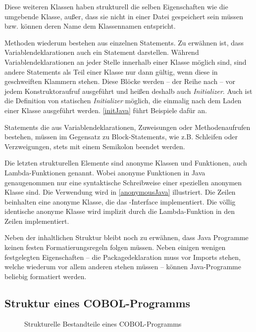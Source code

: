 Diese weiteren Klassen haben strukturell die selben Eigenschaften wie die umgebende Klasse, außer, dass sie nicht in einer Datei gespeichert sein müssen bzw. können deren Name dem Klassennamen entspricht.

Methoden wiederum bestehen aus einzelnen Statements. Zu erwähnen ist, dass Variablendeklarationen auch ein Statement darstellen. Während Variablendeklarationen an jeder Stelle innerhalb einer Klasse möglich sind, sind andere Statements als Teil einer Klasse nur dann gültig, wenn diese in geschweiften Klammern stehen. Diese Blöcke werden -- der Reihe nach -- vor jedem Konstruktoraufruf ausgeführt und heißen deshalb auch \textit{Initializer}. Auch ist die Definition von statischen \textit{Initializer} möglich, die einmalig nach dem Laden einer Klasse ausgeführt werden. \autoref{initJava} führt Beispiele dafür an.


Statements die aus Variablendeklarationen, Zuweisungen oder Methodenaufrufen bestehen, müssen im Gegensatz zu Block-Statements, wie z.B. Schleifen oder Verzweigungen, stets mit einem Semikolon beendet werden. 

Die letzten strukturellen Elemente sind anonyme Klassen und Funktionen, auch Lambda-Funktionen genannt. Wobei anonyme Funktionen in Java genaugenommen nur eine syntaktische Schreibweise einer speziellen anonymen Klasse sind. Die Verwendung wird in \autoref{anonymousJava} illustriert. Die Zeilen  beinhalten eine anonyme Klasse, die das -Interface implementiert. Die völlig identische  anonyme Klasse wird implizit durch die Lambda-Funktion in den Zeilen  implementiert.


Neben der inhaltlichen Struktur bleibt noch zu erwähnen, dass Java Programme keinen festen Formatierungsregeln folgen müssen. Neben einigen wenigen festgelegten Eigenschaften -- die Packagedeklaration muss vor Imports stehen, welche wiederum vor allem anderen stehen müssen -- können Java-Programme beliebig formatiert werden.

\subsection*{Struktur eines COBOL-Programms}\label{cobolstructure}

\begin{figure}[H]
    \centering
    \resizebox{.9\linewidth}{!}{\unskip}
    \caption{Strukturelle Bestandteile eines COBOL-Programms \label{cobolStructureDiagram}}
\end{figure}

